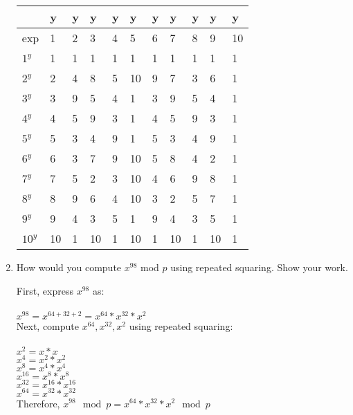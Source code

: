 \documentclass[11pt]{article}
\begin{document}
\begin{enumerate}
\begin{tabular}{ l | l | l | l | l | l | l | l | l | l | l }
   & y & y & y & y & y & y & y & y & y & y\\ \hline
  exp & 1 & 2 & 3 & 4 & 5 & 6 & 7 & 8 & 9 & 10\\ \hline
  $1^y$ & 1 & 1 & 1 & 1 & 1 & 1 & 1 & 1 & 1 & 1\\ \hline
  $2^y$ & 2 & 4 & 8 & 5 & 10 & 9 & 7 & 3 & 6 & 1\\ \hline
  $3^y$ & 3 & 9 & 5 & 4 & 1 & 3 & 9 & 5 & 4 & 1\\ \hline
  $4^y$ & 4 & 5 & 9 & 3 & 1 & 4 & 5 & 9 & 3 & 1\\ \hline
  $5^y$ & 5 & 3 & 4 & 9 & 1 & 5 & 3 & 4 & 9 & 1\\ \hline
  $6^y$ & 6 & 3 & 7 & 9 & 10 & 5 & 8 & 4 & 2 & 1\\ \hline
  $7^y$ & 7 & 5 & 2 & 3 & 10 & 4 & 6 & 9 & 8 & 1\\ \hline
  $8^y$ & 8 & 9 & 6 & 4 & 10 & 3 & 2 & 5 & 7 & 1\\ \hline
  $9^y$ & 9 & 4 & 3 & 5 & 1 & 9 & 4 & 3 & 5 & 1\\ \hline
  $10^y$ & 10 & 1 & 10 & 1 & 10 & 1 & 10 & 1 & 10 & 1
\end{tabular}

\item How would you compute $x^{98}$ mod $p$ using repeated squaring. Show
  your work.

First, express $x^{98}$ as:\\\\
$x^{98} = x^{64+32+2} = x^{64} * x^{32} * x^{2}$\\

Next, compute $x^{64}, x^{32}, x^{2}$ using repeated squaring:\\\\
$x^2 = x * x$\\
$x^4 = x^2 * x^2$\\
$x^8 = x^4 * x^4$\\
$x^{16} = x^8 * x^8$\\
$x^{32} = x^{16} * x^{16}$\\
$x^{64} = x^{32} * x^{32}$\\

Therefore, $x^{98} \mod p = x^{64} * x^{32} * x^{2} \mod p$

\end{enumerate}
\end{document}
